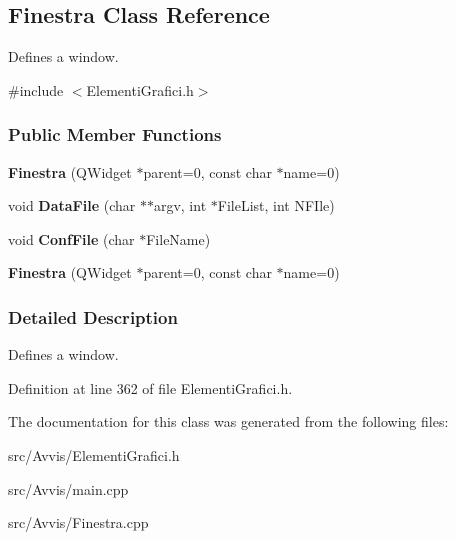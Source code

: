 \hypertarget{classFinestra}{\subsection{\-Finestra \-Class \-Reference}
\label{classFinestra}
}


\-Defines a window.  




{\ttfamily \#include $<$\-Elementi\-Grafici.\-h$>$}

\subsubsection*{\-Public \-Member \-Functions}
\begin{DoxyCompactItemize}
\item 
\hypertarget{classFinestra_a8ec00c73de692c63ac3cc1ff48cf1150}{{\bfseries \-Finestra} (\-Q\-Widget $\ast$parent=0, const char $\ast$name=0)}\label{classFinestra_a8ec00c73de692c63ac3cc1ff48cf1150}

\item 
\hypertarget{classFinestra_a0350b9437e10e751a3e55be68ca552ff}{void {\bfseries \-Data\-File} (char $\ast$$\ast$argv, int $\ast$\-File\-List, int \-N\-F\-Ile)}\label{classFinestra_a0350b9437e10e751a3e55be68ca552ff}

\item 
\hypertarget{classFinestra_a418fd69a796855fc20dcdaf6bb94fc68}{void {\bfseries \-Conf\-File} (char $\ast$\-File\-Name)}\label{classFinestra_a418fd69a796855fc20dcdaf6bb94fc68}

\item 
\hypertarget{classFinestra_a8ec00c73de692c63ac3cc1ff48cf1150}{{\bfseries \-Finestra} (\-Q\-Widget $\ast$parent=0, const char $\ast$name=0)}\label{classFinestra_a8ec00c73de692c63ac3cc1ff48cf1150}

\end{DoxyCompactItemize}


\subsubsection{\-Detailed \-Description}
\-Defines a window. 

\-Definition at line 362 of file \-Elementi\-Grafici.\-h.



\-The documentation for this class was generated from the following files\-:\begin{DoxyCompactItemize}
\item 
src/\-Avvis/\-Elementi\-Grafici.\-h\item 
src/\-Avvis/main.\-cpp\item 
src/\-Avvis/\-Finestra.\-cpp\end{DoxyCompactItemize}
